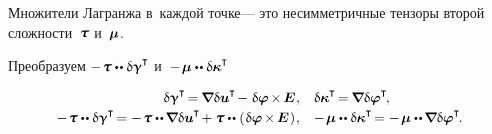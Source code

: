\begin{otherlanguage}{russian}

\vspace{-0.2em} \noindent Множители Лагранжа в~каждой точке\:--- это несимметричные тензоры второй сложности~$\forcestresstensor$ и~$\bm{\mu}$.

Преобразуем ${- \hspace{.2ex} \forcestresstensor \dotdotp \variation{\distortiontensor}^{\T}}$ и~${- \hspace{.2ex} \couplestresstensor \dotdotp \variation{\wrynesstensor}^{\T}}$

\nopagebreak\begin{equation*}
\begin{array}{rl}
\variation{\distortiontensor}^{\T} \hspace{-0.32ex}
= \hspace{-0.16ex} \boldnabla \variation{\fieldofdisplacements}^{\hspace{-0.05ex}\T} \hspace{-0.3ex}
- \hspace{.1ex} \variation{\fieldofrotations} \hspace{-0.2ex} \times \hspace{-0.2ex} \bm{E} \hspace{.1ex}
, &
\variation{\wrynesstensor}^{\T} \hspace{-0.32ex} = \hspace{-0.16ex} \boldnabla \variation{\fieldofrotations}^{\T} \hspace{-0.25ex} ,
\\[.25em]
%
- \hspace{.2ex} \forcestresstensor \dotdotp \variation{\distortiontensor}^{\T} \hspace{-0.32ex}
= - \hspace{.2ex} \forcestresstensor \dotdotp \hspace{-0.16ex} \boldnabla \variation{\fieldofdisplacements}^{\hspace{-0.05ex}\T} \hspace{-0.3ex}
+ \forcestresstensor \dotdotp \hspace{-0.32ex} \left( \hspace{.12ex} \variation{\fieldofrotations} \hspace{-0.2ex} \times \hspace{-0.2ex} \bm{E} \hspace{.12ex} \right) \hspace{-0.25ex}
, &
- \hspace{.2ex} \couplestresstensor \dotdotp \variation{\wrynesstensor}^{\T} \hspace{-0.32ex}
= - \hspace{.2ex} \couplestresstensor \dotdotp \hspace{-0.16ex} \boldnabla \variation{\fieldofrotations}^{\T} \hspace{-0.25ex} .
\end{array}
\end{equation*}


\end{otherlanguage}
